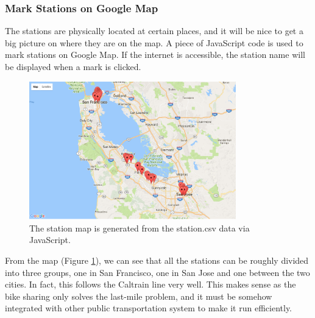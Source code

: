 \documentclass[a4paper]{article}
\begin{document}
			\subsubsection{Mark Stations on Google Map}
			The stations are physically located at certain places, and it will be nice to get a big picture on where they are on the map. A piece of JavaScript code is used to mark stations on Google Map. If the internet is accessible, the station name will be displayed when a mark is clicked.
			\begin{figure}
				\centering
				\includegraphics[width=0.8\textwidth]{Station_Map.png}
				\caption{\label{fig:map}The station map is generated from the station.csv data via JavaScript.}
			\end{figure}
			From the map (Figure \ref{fig:map}), we can see that all the stations can be roughly divided into three groups, one in San Francisco, one in San Jose and one between the two cities. In fact, this follows the Caltrain line very well. This makes sense as the bike sharing only solves the last-mile problem, and it must be somehow integrated with other public transportation system to make it run efficiently.
			
\end{document}
